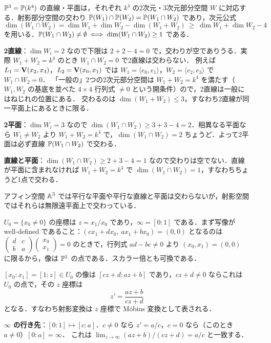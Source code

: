 $\mathbb{P}^3=\mathbb{P}(k^4)$ の直線・平面は，それぞれ $k^4$ の2次元・3次元部分空間 $W$ に対応する．射影部分空間の交わり $\mathbb{P}(W_1)\cap\mathbb{P}(W_2)=\mathbb{P}(W_1\cap W_2)$ であり，次元公式
\[
  \dim(W_1\cap W_2)=\dim W_1+\dim W_2-\dim(W_1+W_2)\ \ge\ \dim W_1+\dim W_2-4
\]
を用いる．$\mathbb{P}(W_1\cap W_2)\neq\emptyset\iff\dim(W_1\cap W_2)\ge1$ である．

\textbf{2直線}：$\dim W_i=2$ なので下限は $2+2-4=0$ で，交わりが空でありうる．実際 $W_1+W_2=k^4$ のとき $W_1\cap W_2=0$ で2直線は交わらない．
例えば $L_1=\mathbf{V}(x_2,x_3)$，$L_2=\mathbf{V}(x_0,x_1)$ では $W_1=\langle e_0,e_1\rangle$，$W_2=\langle e_2,e_3\rangle$ で $W_1\cap W_2=0$．
「一般の」2つの2次元部分空間は $W_1+W_2=k^4$ を満たす（$W_1,W_2$ の基底を並べた $4\times4$ 行列式 $\neq0$ という開条件）ので，2直線は一般にはねじれの位置にある．
交わるのは $\dim(W_1+W_2)\le3$，すなわち2直線が同一平面上にあるときに限る．

\textbf{2平面}：$\dim W_i=3$ なので $\dim(W_1\cap W_2)\ge3+3-4=2$．相異なる平面なら $W_1\neq W_2$ より $W_1+W_2=k^4$ で，$\dim(W_1\cap W_2)=2$ ちょうど．よって2平面は必ず直線 $\mathbb{P}(W_1\cap W_2)$ で交わる．

\textbf{直線と平面}：$\dim(W_1\cap W_2)\ge2+3-4=1$ なので交わりは空でない．直線が平面に含まれなければ $W_1+W_2=k^4$ で $\dim(W_1\cap W_2)=1$，すなわちちょうど1点で交わる．

アフィン空間 $\mathbb{A}^3$ では平行な平面や平行な直線と平面は交わらないが，射影空間ではそれらは無限遠平面上で交わっている．

$U_0=\{x_0\neq0\}$ の座標は $z=x_1/x_0$ であり，$\infty=[0:1]$ である．まず写像が well-defined であること：$(cx_1+dx_0,\ ax_1+bx_0)=(0,0)$ となるのは $\begin{pmatrix}d&c\\b&a\end{pmatrix}\begin{pmatrix}x_0\\x_1\end{pmatrix}=0$ のときで，行列式 $ad-bc\neq0$ より $(x_0,x_1)=(0,0)$ に限るから，像は $\mathbb{P}^1$ の点である．スカラー倍とも可換である．

$[x_0:x_1]=[1:z]\in U_0$ の像は $[cz+d:az+b]$ であり，$cz+d\neq0$ ならこれは $U_0$ の点で，その $z$ 座標は
\[
  z'=\frac{az+b}{cz+d}
\]
となる．すなわち射影変換は $z$ 座標で Möbius 変換として表される．

\textbf{$\infty$ の行き先}：$[0:1]\mapsto[c:a]$．$c\neq0$ なら $z'=a/c$，$c=0$ なら（このとき $a\neq0$）$[0:a]=\infty$．
これは $\lim_{z\to\infty}(az+b)/(cz+d)=a/c$ と一致する．

